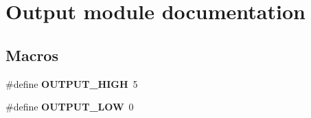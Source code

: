 \hypertarget{group___output__module}{}\section{Output module documentation}
\label{group___output__module}
\subsection*{Macros}
\begin{DoxyCompactItemize}
\item 
\hypertarget{group___output__module_ga93f2dc9bb4f0a14418811ce6264d70e3}{}\#define {\bfseries O\+U\+T\+P\+U\+T\+\_\+\+H\+I\+G\+H}~5\label{group___output__module_ga93f2dc9bb4f0a14418811ce6264d70e3}

\item 
\hypertarget{group___output__module_ga3f3cd899a24b55f66b4a5a2697677774}{}\#define {\bfseries O\+U\+T\+P\+U\+T\+\_\+\+L\+O\+W}~0\label{group___output__module_ga3f3cd899a24b55f66b4a5a2697677774}

\end{DoxyCompactItemize}
